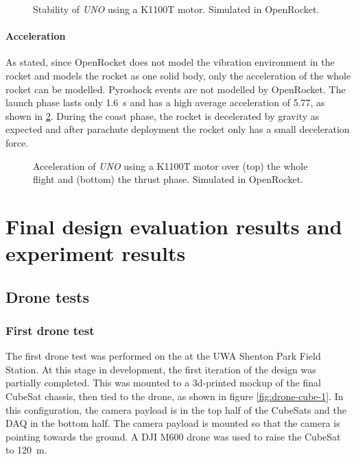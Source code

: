 \documentclass[]{report}
\begin{document}
\begin{figure}[H]
  
  \caption{Stability of \textit{UNO} using a K1100T motor. Simulated in OpenRocket.}
  \label{fig:openrocket-k-stability}
\end{figure}

\subsubsection{Acceleration}

As stated, since OpenRocket does not model the vibration environment in the rocket and models the rocket as one solid body, only the acceleration of the whole rocket can be modelled. Pyroshock events are not modelled by OpenRocket. The launch phase lasts only \SI{1.6}{\second} and has a high average acceleration of \SI{5.77}{\gacc}, as shown in \ref{fig:openrocket-k-acceleration}. During the coast phase, the rocket is decelerated by gravity as expected and after parachute deployment the rocket only has a small deceleration force.

\begin{figure}[H]
  
  
  \caption{Acceleration of \textit{UNO} using a K1100T motor over (top) the whole flight and (bottom) the thrust phase. Simulated in OpenRocket.}
  \label{fig:openrocket-k-acceleration}
\end{figure}


\chapter{Final design evaluation results and experiment results}

\section{Drone tests}
\subsection{First drone test}

The first drone test was performed on the  at the UWA Shenton Park Field Station. At this stage in development, the first iteration of the design was partially completed. This was mounted to a 3d-printed mockup of the final CubeSat chassis, then tied to the drone, as shown in figure \ref{fig:drone-cube-1}. In this configuration, the camera payload is in the top half of the CubeSats and the DAQ in the bottom half. The camera payload is mounted so that the camera is pointing towards the ground. A DJI M600 drone was used to raise the CubeSat to \SI{120}{\metre}.
\end{document}
